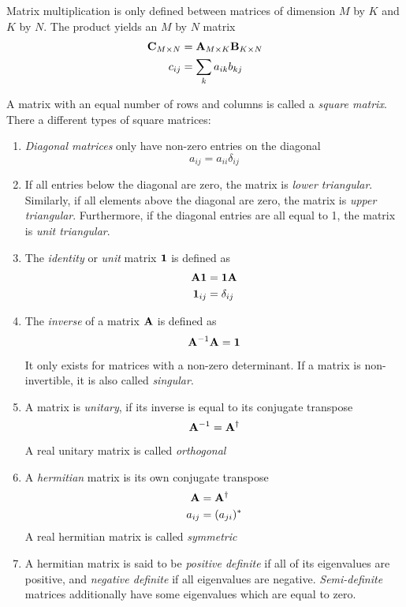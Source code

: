 Matrix multiplication is only defined between matrices of dimension $M$ by $K$ and $K$ by $N$. The product yields an $M$ by $N$ matrix
\begin{align}
\mathbf{C}_{M\times N} &= \mathbf{A}_{M\times K} \mathbf{B}_{K\times N} \\
c_{ij} &= \sum_k a_{ik} b_{kj}
\end{align}

A matrix with an equal number of rows and columns is called a \emph{square matrix}. There a different types of square matrices:
\begin{enumerate}
\item \emph{Diagonal matrices} only have non-zero entries on the diagonal
\begin{equation}
a_{ij} = a_{ii} \delta_{ij}
\end{equation}

\item If all entries below the diagonal are zero, the matrix is \emph{lower triangular}. Similarly, if all elements above the diagonal are zero, the matrix is \emph{upper triangular}. Furthermore, if the diagonal entries are all equal to 1, the matrix is \emph{unit triangular}.

\item The \emph{identity} or \emph{unit} matrix $\mathbf{1}$ is defined as
\begin{align}
\mathbf{A} \mathbf{1} &= \mathbf{1} \mathbf{A} \\
\mathbf{1}_{ij} &= \delta_{ij}
\end{align} 

\item The \emph{inverse} of a matrix $\mathbf{A}$ is defined as
\begin{equation}
\mathbf{A}^{-1} \mathbf{A} = \mathbf{1}
\end{equation} 
\noindent It only exists for matrices with a non-zero determinant. If a matrix is non-invertible, it is also called \emph{singular}. 

\item A matrix is \emph{unitary}, if its inverse is equal to its conjugate transpose 
\begin{equation}
\mathbf{A}^{-1} = \mathbf{A}^{\dagger}
\end{equation}
\noindent A real unitary matrix is called \emph{orthogonal}

\item A \emph{hermitian} matrix is its own conjugate transpose
\begin{align}
\mathbf{A} &= \mathbf{A}^{\dagger} \\
a_{ij} &= (a_{ji})^*
\end{align}
\noindent A real hermitian matrix is called \emph{symmetric}

\item A hermitian matrix is said to be \emph{positive definite} if all of its eigenvalues are positive, and \emph{negative definite} if all eigenvalues are negative. \emph{Semi-definite} matrices additionally have some eigenvalues which are equal to zero.   
\end{enumerate}

